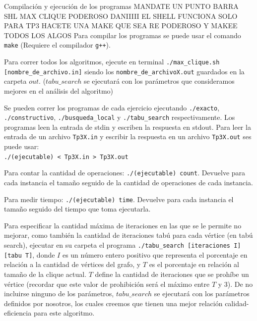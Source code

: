 \documentclass[12pt,titlepage]{article}
\begin{document}
	\begin{section}{Compilación y ejecución de los programas}
	MANDATE UN PUNTO BARRA SHL MAX CLIQUE PODEROSO DANIIIII EL SHELL FUNCIONA SOLO PARA TP3
	HACETE UNA MAKE QUE SEA RE PODEROSO Y MAKEE TODOS LOS ALGOS
	Para compilar los programas se puede usar el comando \texttt{make} (Requiere el compilador \texttt{g++}).
	
	Para correr todos los algoritmos, ejecute en terminal \texttt{./max\_clique.sh [nombre\_de\_archivo.in]} siendo los \texttt{nombre\_de\_archivoX.out} guardados en la carpeta $out$. ($tabu\_search$ se ejecutará con los parámetros que consideramos mejores en el análisis del algoritmo)
		
	Se pueden correr los programas de cada ejercicio ejecutando \texttt{./exacto}, \texttt{./constructivo}, \texttt{./busqueda\_local} y \texttt{./tabu\_search} respectivamente. Los programas leen la entrada de stdin y escriben la respuesta en stdout. Para leer la entrada de un archivo \texttt{Tp3X.in} y escribir la respuesta en un archivo \texttt{Tp3X.out} ses puede usar:\\ \texttt{./(ejecutable) < Tp3X.in > Tp3X.out}

	Para contar la cantidad de operaciones: \texttt{./(ejecutable) count}. Devuelve para cada instancia el tamaño seguido de la cantidad de operaciones de cada instancia.

	Para medir tiempo: \texttt{./(ejecutable) time}. Devuelve para cada instancia el tamaño seguido del tiempo que toma ejecutarla.

	Para especificar la cantidad máxima de iteraciones en las que se le permite no mejorar, como también la cantidad de iteraciones tabú para cada vértice (en tabú search), ejecutar en su carpeta el programa \texttt{./tabu\_search [iteraciones \texttt{I}] [tabu \texttt{T}]}, donde $I$ es un número entero positivo que representa el porcentaje en relación a la cantidad de vértices del grafo, y $T$ es el porcentaje en relación al tamaño de la clique actual. $T$ define la cantidad de iteraciones que se prohíbe un vértice (recordar que este valor de prohibición será el máximo entre $T$ y 3).
	De no incluirse ninguno de los parámetros, $tabu\_search$ se ejecutará con los parámetros definidos por nosotros, los cuales creemos que tienen una mejor relación calidad-eficiencia para este algoritmo.

	\end{section}
\end{document}
